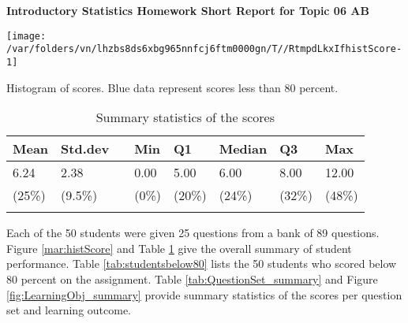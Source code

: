 \documentclass[12pt,english,nohyper]{tufte-handout}\usepackage[]{graphicx}\usepackage[]{color}
\newenvironment{knitrout}{}{} %
\begin{document}
\setcaptionfont{
  \normalfont\footnotesize
  \color{black}
}





\centerline{\Large\bf Introductory Statistics Homework Short Report for Topic 06 AB}
\vspace{1cm}

\begin{knitrout}
\color{fgcolor}\begin{marginfigure}
\texttt{[image: /var/folders/vn/lhzbs8ds6xbg965nnfcj6ftm0000gn/T//RtmpdLkxIfhistScore-1]} \caption[Histogram of scores]{Histogram of scores. Blue data represent scores less than 80 percent.}\label{mar:histScore}
\end{marginfigure}


\end{knitrout}

\begin{longtable}{llllllll}
  \hline
Mean & Std.dev &   & Min & Q1 & Median & Q3 & Max \\ 
  \hline
6.24 & 2.38 &  & 0.00 & 5.00 & 6.00 & 8.00 & 12.00 \\ 
  (25\%) & (9.5\%) &  & (0\%) & (20\%) & (24\%) & (32\%) & (48\%) \\ 
   \hline
\hline
\caption{Summary statistics of the scores} 
\label{tab:summary}
\end{longtable}




\newif\ifPositive

\Positivetrue

\ifPositive
Each of the 50 students were given 25 questions from a bank of 89 questions. Figure \ref{mar:histScore} and Table \ref{tab:summary} give the overall summary of student performance. Table \ref{tab:studentsbelow80} lists the 50 students who scored below 80 percent on the assignment. Table \ref{tab:QuestionSet_summary} and Figure \ref{fig:LearningObj_summary} provide summary statistics of the scores per question set and learning outcome.
\else
Each of the 50 students were given 25 questions from a bank of 89 questions. Figure \ref{mar:histScore} and Table \ref{tab:summary} give the overall summary of student performance. Table \ref{tab:QuestionSet_summary} and Figure \ref{fig:LearningObj_summary} provide summary statistics of the scores per question set and learning outcome.
\fi
\end{document}

